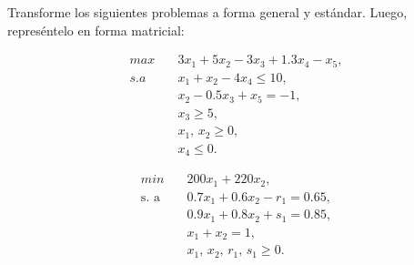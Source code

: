 Transforme los siguientes problemas a forma general y estándar. Luego, represéntelo en forma matricial:

\begin{align*}
max \quad & 3x_1 + 5x_2 - 3x_3 + 1.3x_4 - x_5, \\
s.a \quad & x_1 + x_2 - 4x_4 \leq 10, \\
&x_2 - 0.5x_3 + x_5 = -1, \\
&x_3 \geq 5, \\
&x_1,\, x_2 \geq 0, \\
&x_4 \leq 0.
\end{align*}

\begin{align*}
min \quad & 200x_1 + 220x_2, \\
\text{s. a}\quad & 0.7x_1 + 0.6x_2 - r_1 = 0.65, \\
&0.9x_1 + 0.8x_2 + s_1 = 0.85, \\
&x_1 + x_2 = 1, \\
&x_1,\, x_2,\, r_1,\, s_1 \geq 0.
\end{align*}

